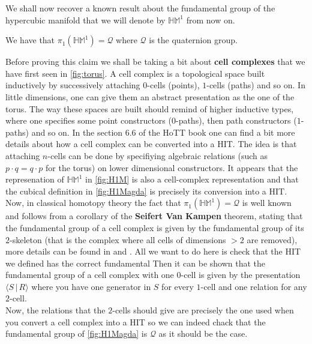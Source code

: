 \documentclass{report}
\begin{document}
We shall now recover a known result about the fundamental group of the hypercubic manifold that we will denote by $\mathbb{HM}^1$ from now on. 
\begin{theorem}
  We have that $\pi_1(\mathbb{HM}^1)=\mathcal{Q}$ where $\mathcal{Q}$ is the quaternion group.
\end{theorem}
Before proving this claim we shall be taking a bit about \textbf{cell complexes} that we have first seen in \ref{fig:torus}. A cell complex is a topological space built inductively by successively attaching $0$-cells (points), $1$-cells (paths) and so on. In little dimensions, one can give them an abstract presentation as the one of the torus. The way these spaces are built should remind of higher inductive types, where one specifies some point constructors ($0$-paths), then path constructors ($1$-paths) and so on. In the section 6.6 of the HoTT book \cite{hott} one can find a bit more details about how a cell complex can be converted into a HIT. The idea is that attaching $n$-cells can be done by specifiying algebraic relations (such as $p \cdot q = q \cdot p$ for the torus) on lower dimensional constructors. It appears that the represenation of $\mathbb{HM}^1$ in \ref{fig:H1M} is also a cell-complex representation and that the cubical definition in \ref{fig:H1Magda} is precisely its conversion into a HIT.\\
Now, in classical homotopy theory the fact that $\pi_1(\mathbb{HM}^1)=\mathcal{Q}$ is well known and follows from a corollary of the \textbf{Seifert Van Kampen} theorem, stating that the fundamental group of a cell complex is given by the fundamental group of its $2$-skeleton (that is the complex where all cells of dimensions $>2$ are removed), more details can be found in \cite{hypercubic} and \cite{FundamentalCellComplex}. All we want to do here is check that the HIT we defined has the correct fundamental Then it can be shown that the fundamental group of a cell complex with one $0$-cell is given by the presentation $\langle S \hspace{2pt} \vert\hspace{2pt} R \rangle$ where you have one generator in $S$ for every $1$-cell and one relation for any $2$-cell.\\
Now, the relations that the $2$-cells should give are precisely the one used when you convert a cell complex into a HIT so we can indeed chack that the fundamental group of \ref{fig:H1Magda} is $\mathcal{Q}$ as it should be the case. 
\printbibliography
\end{document}
